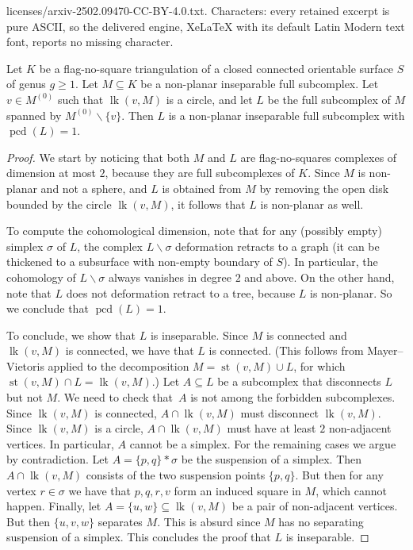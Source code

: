 \documentclass[10pt,a4paper]{amsart}
\newcommand{\lk}[2]{\operatorname{lk}(#1,#2)} %
\newcommand{\pcd}{\operatorname{pcd}}
\newcommand{\st}[2]{\operatorname{st}(#1,#2)} %
\renewcommand{\geq}{\geqslant}
\renewcommand{\setminus}{\smallsetminus}
\begin{document}
licenses/arxiv-2502.09470-CC-BY-4.0.txt. Characters: every retained excerpt is pure ASCII, so the delivered engine, XeLaTeX with its default Latin Modern text font, reports no missing character.
\begin{lemma}\label{lem:menger_vertex}
    Let ${K}$ be a flag-no-square triangulation  of a  closed connected orientable surface $S$ of genus $g\geq 1$.
    Let $M \subseteq {K}$ be a non-planar inseparable full subcomplex. 
    Let $v \in M^{(0)}$ such that $\lk{v}{M}$ is a circle,
    and let $L$ be the full subcomplex of $M$ spanned by $M^{(0)}\setminus \{v\}$.
    Then $L$ is a non-planar inseparable full subcomplex with $\pcd (L)=1$.
\end{lemma}

\begin{proof}
We start by noticing that both $M$ and $L$ are   flag-no-squares   complexes of dimension at most $2$, because they are full subcomplexes of $ K$. 
Since $M$ is non-planar and not a sphere, and $L$ is obtained from $M$ by removing the open disk bounded by the circle $\lk vM$, it follows that $L$ is non-planar as well.
 
To compute the cohomological dimension, note that for any (possibly empty) simplex $\sigma$ of $L$, the complex $L\setminus \sigma$ deformation retracts to a graph (it can be thickened to a subsurface with non-empty boundary of $S$).
In particular, the cohomology of $L\setminus \sigma$ always vanishes in degree $2$ and above.
On the other hand, note that $L$ does not deformation retract to a tree, because $L$ is non-planar. So we conclude that $\pcd(L)=1$.

To conclude, we show that $L$ is inseparable. 
Since $M$ is connected and $\lk vM$ is connected, we have that $L$ is connected. 
(This follows from Mayer--Vietoris applied to the decomposition  $M=\st vM \cup L$, for which $\st vM\cap L=\lk vM$.)  
Let $A\subseteq L$ be a subcomplex that disconnects $L$ but not $M$.
We need to check that~$A$ is not among the forbidden subcomplexes.
Since $\lk vM$ is connected, $A\cap \lk vM$ must disconnect $\lk vM$.
Since $\lk vM$ is a circle, $A\cap \lk vM$ must have at least $2$ non-adjacent vertices.
In particular, $A$ cannot be a simplex.
For the remaining cases we argue by contradiction.
Let $A=\{p,q\}\ast \sigma$ be the suspension of a simplex. Then $A\cap \lk vM$  consists of the two suspension points $\{p,q\}$. 
But then for any vertex $r\in \sigma$ we have that $p,q,r,v$ form an induced square in $M$, which cannot happen.
 Finally, let $A=\{u,w\}\subseteq \lk vM$ be a pair of non-adjacent vertices. 
 But then $\{u,v,w\}$ separates $M$.
 This is absurd since $M$ has no separating suspension of a simplex.
 This concludes the proof that $L$ is inseparable. 
\end{proof}
\end{document}
